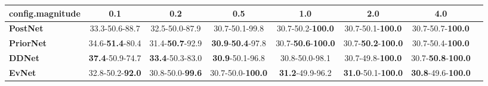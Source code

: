 \begin{tabular}{lccccccc}
\toprule
\textbf{config.magnitude} &                      0.1 &                      0.2 &                               0.5 &                                1.0 &                                2.0 &                                4.0 \\
\midrule
\textbf{PostNet } &           33.3-50.6-88.7 &           32.5-50.0-87.9 &                    30.7-50.1-99.8 &           30.7-50.2-\textbf{100.0} &           30.7-50.1-\textbf{100.0} &           30.7-50.7-\textbf{100.0} \\
\textbf{PriorNet} &  34.6-\textbf{51.4}-80.4 &  31.4-\textbf{50.7}-92.9 &  \textbf{30.9}-\textbf{50.4}-97.8 &  30.7-\textbf{50.6}-\textbf{100.0} &  30.7-\textbf{50.2}-\textbf{100.0} &           30.7-50.4-\textbf{100.0} \\
\textbf{DDNet   } &  \textbf{37.4}-50.9-74.7 &  \textbf{33.4}-50.3-83.0 &           \textbf{30.9}-50.1-96.8 &                     30.8-50.0-98.1 &           30.7-49.8-\textbf{100.0} &  30.7-\textbf{50.8}-\textbf{100.0} \\
\textbf{EvNet   } &  32.8-50.2-\textbf{92.0} &  30.8-50.0-\textbf{99.6} &          30.7-50.0-\textbf{100.0} &            \textbf{31.2}-49.9-96.2 &  \textbf{31.0}-50.1-\textbf{100.0} &  \textbf{30.8}-49.6-\textbf{100.0} \\
\bottomrule
\end{tabular}
